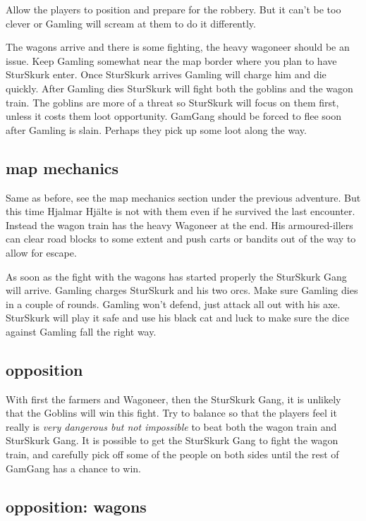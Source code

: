 Allow the players to position and prepare for the robbery. But it can't be too clever or Gamling will scream at them to do it differently.

The wagons arrive and there is some fighting, the heavy wagoneer should be an issue. Keep Gamling somewhat near the map border where you plan to have SturSkurk enter. Once SturSkurk arrives Gamling will charge him and die quickly. After Gamling dies SturSkurk will fight both the goblins and the wagon train. The goblins are more of a threat so SturSkurk will focus on them first, unless it costs them loot opportunity.
GamGang should be forced to flee soon after Gamling is slain. Perhaps they pick up some loot along the way.


\subsection*{map mechanics}

Same as before, see the map mechanics section under the previous adventure. But this time Hjalmar Hjälte is not with them even if he survived the last encounter. Instead the wagon train has the heavy Wagoneer at the end. His armoured-illers can clear road blocks to some extent and push carts or bandits out of the way to allow for escape.

As soon as the fight with the wagons has started properly the SturSkurk Gang will arrive. Gamling charges SturSkurk and his two orcs. Make sure Gamling dies in a couple of rounds. Gamling won't defend, just attack all out with his axe. SturSkurk will play it safe and use his black cat and luck to make sure the dice against Gamling fall the right way.


\subsection*{opposition}

With first the farmers and Wagoneer, then the SturSkurk Gang, it is unlikely that the Goblins will win this fight. Try to balance so that the players feel it really is \emph{very dangerous but not impossible} to beat both the wagon train and SturSkurk Gang. It is possible to get the SturSkurk Gang to fight the wagon train, and carefully pick off some of the people on both sides until the rest of GamGang has a chance to win.


\subsection*{opposition: wagons}

